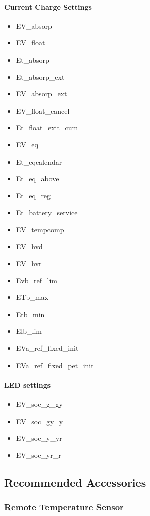 \paragraph{Current Charge Settings}
\begin{itemize}
	\item EV\_absorp
	\item EV\_float
	\item Et\_absorp
	\item Et\_absorp\_ext
	\item EV\_absorp\_ext
	\item EV\_float\_cancel
	\item Et\_float\_exit\_cum
	\item EV\_eq
	\item Et\_eqcalendar
	\item Et\_eq\_above
	\item Et\_eq\_reg
	\item Et\_battery\_service
	\item EV\_tempcomp
	\item EV\_hvd
	\item EV\_hvr
	\item Evb\_ref\_lim
	\item ETb\_max
	\item Etb\_min
	\item Elb\_lim
	\item EVa\_ref\_fixed\_init
	\item EVa\_ref\_fixed\_pet\_init
\end{itemize}
\par

\paragraph{LED settings}
\begin{itemize}
	\item EV\_soc\_g\_gy
	\item EV\_soc\_gy\_y
	\item EV\_soc\_y\_yr
	\item EV\_soc\_yr\_r
\end{itemize}
\par

\subsection{Recommended Accessories}

\subsubsection{Remote Temperature Sensor}

